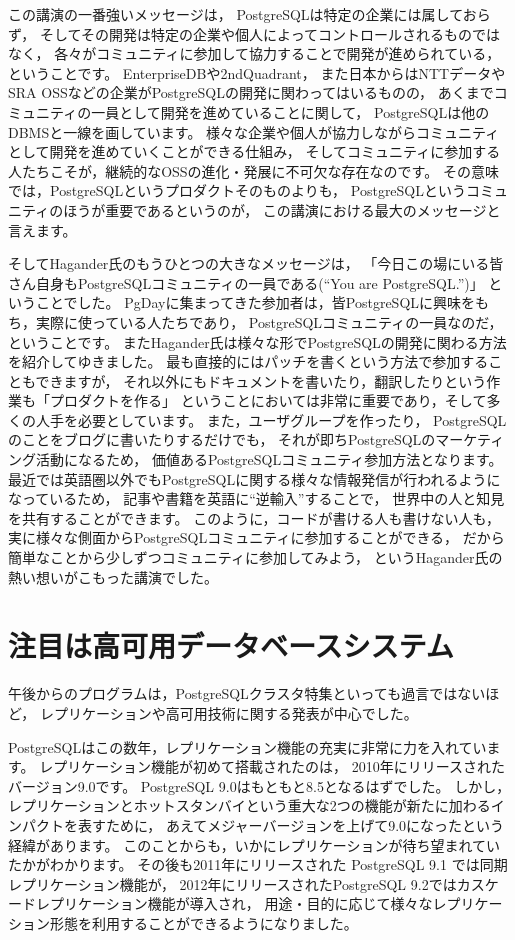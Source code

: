この講演の一番強いメッセージは，
PostgreSQLは特定の企業には属しておらず，
そしてその開発は特定の企業や個人によってコントロールされるものではなく，
各々がコミュニティに参加して協力することで開発が進められている，
ということです。
EnterpriseDBや2ndQuadrant，
また日本からはNTTデータやSRA OSSなどの企業がPostgreSQLの開発に関わってはいるものの，
あくまでコミュニティの一員として開発を進めていることに関して，
PostgreSQLは他のDBMSと一線を画しています。
様々な企業や個人が協力しながらコミュニティとして開発を進めていくことができる仕組み，
そしてコミュニティに参加する人たちこそが，継続的なOSSの進化・発展に不可欠な存在なのです。
その意味では，PostgreSQLというプロダクトそのものよりも，
PostgreSQLというコミュニティのほうが重要であるというのが，
この講演における最大のメッセージと言えます。

そしてHagander氏のもうひとつの大きなメッセージは，
「今日この場にいる皆さん自身もPostgreSQLコミュニティの一員である(``You are PostgreSQL.'')」
ということでした。
PgDayに集まってきた参加者は，皆PostgreSQLに興味をもち，実際に使っている人たちであり，
PostgreSQLコミュニティの一員なのだ，ということです。
またHagander氏は様々な形でPostgreSQLの開発に関わる方法を紹介してゆきました。
最も直接的にはパッチを書くという方法で参加することもできますが，
それ以外にもドキュメントを書いたり，翻訳したりという作業も「プロダクトを作る」
ということにおいては非常に重要であり，そして多くの人手を必要としています。
また，ユーザグループを作ったり，
PostgreSQLのことをブログに書いたりするだけでも，
それが即ちPostgreSQLのマーケティング活動になるため，
価値あるPostgreSQLコミュニティ参加方法となります。
最近では英語圏以外でもPostgreSQLに関する様々な情報発信が行われるようになっているため，
記事や書籍を英語に``逆輸入''することで，
世界中の人と知見を共有することができます。
このように，コードが書ける人も書けない人も，
実に様々な側面からPostgreSQLコミュニティに参加することができる，
だから簡単なことから少しずつコミュニティに参加してみよう，
というHagander氏の熱い想いがこもった講演でした。

\section{注目は高可用データベースシステム}

午後からのプログラムは，PostgreSQLクラスタ特集といっても過言ではないほど，
レプリケーションや高可用技術に関する発表が中心でした。

PostgreSQLはこの数年，レプリケーション機能の充実に非常に力を入れています。
レプリケーション機能が初めて搭載されたのは，
2010年にリリースされたバージョン9.0です。
PostgreSQL 9.0はもともと8.5となるはずでした。
しかし，レプリケーションとホットスタンバイという重大な2つの機能が新たに加わるインパクトを表すために，
あえてメジャーバージョンを上げて9.0になったという経緯があります。
このことからも，いかにレプリケーションが待ち望まれていたかがわかります。
その後も2011年にリリースされた PostgreSQL 9.1 では同期レプリケーション機能が，
2012年にリリースされたPostgreSQL 9.2ではカスケードレプリケーション機能が導入され，
用途・目的に応じて様々なレプリケーション形態を利用することができるようになりました。

